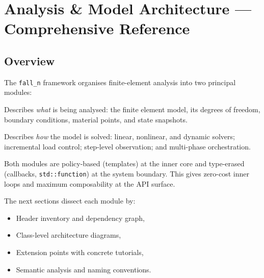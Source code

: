 \chapter{Analysis \& Model Architecture — Comprehensive Reference}
\label{ch:analysis_model_architecture}



\section{Overview}
\label{sec:arch:overview}

The \texttt{fall\_n} framework organises finite-element analysis into two
principal modules:

\begin{description}[style=nextline]
  \item[\texttt{src/model/}]
    Describes \emph{what} is being analysed: the finite element model, its
    degrees of freedom, boundary conditions, material points, and state
    snapshots.

  \item[\texttt{src/analysis/}]
    Describes \emph{how} the model is solved: linear, nonlinear, and dynamic
    solvers; incremental load control; step-level observation; and multi-phase
    orchestration.
\end{description}

Both modules are policy-based (templates) at the inner core and type-erased
(callbacks, \texttt{std::function}) at the system boundary.  This gives
zero-cost inner loops and maximum composability at the API surface.

The next sections dissect each module by:
\begin{itemize}[nosep]
  \item Header inventory and dependency graph,
  \item Class-level architecture diagrams,
  \item Extension points with concrete tutorials,
  \item Semantic analysis and naming conventions.
\end{itemize}


